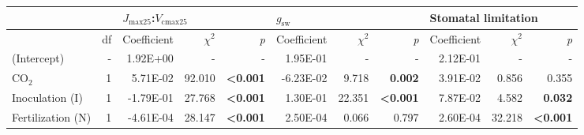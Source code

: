 \begin{landscape}
\begin{table}[]
{\begin{tabular}{p{3cm}p{0.5cm}p{1.75cm}p{1.5cm}p{1.5cm}p{1.75cm}p{1.5cm}p{1.5cm}p{1.75cm}p{1.5cm}p{1.5cm}}
            && \multicolumn{3}{l}{$J_{\mathrm{max25}}$:$V_\mathrm{cmax25}$} 
            &  \multicolumn{3}{l}{$g_{\mathrm{sw}}$}
            &  \multicolumn{3}{l}{Stomatal limitation}
            \\
            \hline
            & \multicolumn{1}{r}{df}
            & \multicolumn{1}{r}{Coefficient}   & \multicolumn{1}{r}{$\chi^{2}$}    & \multicolumn{1}{r}{\textit{p}}
            & \multicolumn{1}{r}{Coefficient}   & \multicolumn{1}{r}{$\chi^{2}$}    & \multicolumn{1}{r}{\textit{p}} 
            & \multicolumn{1}{r}{Coefficient}   & \multicolumn{1}{r}{$\chi^{2}$}    & \multicolumn{1}{r}{\textit{p}}  
            \\
            \hline

            (Intercept) & \multicolumn{1}{r}{-}
            & \multicolumn{1}{r}{1.92E+00}      & \multicolumn{1}{r}{-}             & \multicolumn{1}{r}{-}
            & \multicolumn{1}{r}{1.95E-01}      & \multicolumn{1}{r}{-}             & \multicolumn{1}{r}{-}
            & \multicolumn{1}{r}{2.12E-01}      & \multicolumn{1}{r}{-}             & \multicolumn{1}{r}{-}
            \\

            CO$_2$ & \multicolumn{1}{r}{1}
            & \multicolumn{1}{r}{ 5.71E-02}     & \multicolumn{1}{r}{92.010}        & \multicolumn{1}{r}{\textbf{<0.001}}
            & \multicolumn{1}{r}{-6.23E-02}     & \multicolumn{1}{r}{9.718}         & \multicolumn{1}{r}{\textbf{ 0.002}}
            & \multicolumn{1}{r}{ 3.91E-02}     & \multicolumn{1}{r}{0.856}         & \multicolumn{1}{r}{0.355} 
            \\

            Inoculation (I) & \multicolumn{1}{r}{1}
            & \multicolumn{1}{r}{-1.79E-01}     & \multicolumn{1}{r}{27.768}        & \multicolumn{1}{r}{\textbf{<0.001}}
            & \multicolumn{1}{r}{ 1.30E-01}     & \multicolumn{1}{r}{22.351}        & \multicolumn{1}{r}{\textbf{<0.001}}
            & \multicolumn{1}{r}{ 7.87E-02}     & \multicolumn{1}{r}{4.582}         & \multicolumn{1}{r}{\textbf{ 0.032}} 
            \\

            Fertilization (N) & \multicolumn{1}{r}{1}
            & \multicolumn{1}{r}{-4.61E-04}     & \multicolumn{1}{r}{28.147}        & \multicolumn{1}{r}{\textbf{<0.001}}
            & \multicolumn{1}{r}{ 2.50E-04}     & \multicolumn{1}{r}{0.066}         & \multicolumn{1}{r}{0.797}
            & \multicolumn{1}{r}{ 2.60E-04}     & \multicolumn{1}{r}{32.218}        & \multicolumn{1}{r}{\textbf{<0.001}} 
            \\


\end{tabular}}
\end{table}
\end{landscape}
